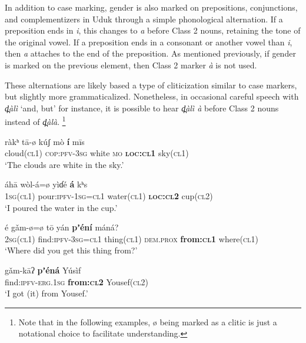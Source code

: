 \documentclass[output=collectionpaper,hidelinks]{langscibook}
\theoremstyle{remark}
\begin{document}
In addition to case marking, gender is also marked on prepositions,
conjunctions, and complementizers in Uduk through a simple phonological
alternation.  If a preposition ends in \emph{i}, this changes to \emph{a} before
Class 2 nouns, retaining the tone of the original vowel.  If a preposition ends
in a consonant or another vowel than \emph{i}, then \emph{a} attaches to the end
of the preposition.  As mentioned previously, if gender is marked on the
previous element, then Class 2 marker \emph{à} is not used.

These alternations are likely based a type of cliticization similar to case
markers, but slightly more grammaticalized.  Nonetheless, in occasional careful
speech with \emph{d̪àlì} `and, but' for instance, it is possible to hear
\emph{d̪àlì à} before Class 2 nouns instead of \emph{d̪àlà}.%
\footnote{Note that in the following examples, ø being marked as a clitic is just a notational
choice to facilitate understanding.}

\ea
\gll  ràkʰ tā-ø kúʃ mò \textbf{í} mīs \\
 cloud(\textsc{cl1}) \textsc{cop}:\textsc{pfv}-\textsc{3sg} white \textsc{mo} \textbf{\textsc{loc:cl1}} sky(\textsc{cl1}) \\
\glt `The clouds are white in the sky.' \\
\z

\ea
\gll  áhā wòl-á=ø yìɗé \textbf{á} kʰ\oMidLow{}\hspace*{-.4mm}s \\
 \textsc{1sg}(\textsc{cl1}) pour:\textsc{ipfv}-\textsc{1sg}=\textsc{cl1} water(\textsc{cl1}) \textbf{\textsc{loc:cl2}} cup(\textsc{cl2}) \\
\glt `I poured the water in the cup.' \\
\z

\ea
\gll  é gǎm-ø=ø tō yán \textbf{pʼéní} máná? \\
 \textsc{2sg}(\textsc{cl1}) find:\textsc{ipfv}-\textsc{3sg}=\textsc{cl1} thing(\textsc{cl1}) \textsc{dem.prox} \textbf{from:\textsc{cl1}} where(\textsc{cl1}) \\
\glt `Where did you get this thing from?' \\
\z

\ea
\gll  gǎm-kāʔ \textbf{pʼéná} Yúsìf \\
 find:\textsc{ipfv}-\textsc{erg.1sg} \textbf{from:\textsc{cl2}} Yousef(\textsc{cl2}) \\
\glt `I got (it) from Yousef.' \\
\z
\end{document}
